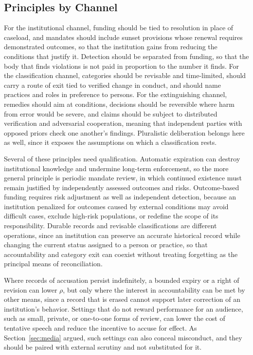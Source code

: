 \documentclass[12pt]{article}
\theoremstyle{remark}
\begin{document}
\subsection{Principles by Channel}

For the institutional channel, funding should be tied to resolution in place of caseload, and mandates should include sunset provisions whose renewal requires demonstrated outcomes, so that the institution gains from reducing the conditions that justify it. Detection should be separated from funding, so that the body that finds violations is not paid in proportion to the number it finds. For the classification channel, categories should be revisable and time-limited, should carry a route of exit tied to verified change in conduct, and should name practices and roles in preference to persons. For the extinguishing channel, remedies should aim at conditions, decisions should be reversible where harm from error would be severe, and claims should be subject to distributed verification and adversarial cooperation, meaning that independent parties with opposed priors check one another's findings. Pluralistic deliberation belongs here as well, since it exposes the assumptions on which a classification rests.

Several of these principles need qualification. Automatic expiration can destroy institutional knowledge and undermine long-term enforcement, so the more general principle is periodic mandate review, in which continued existence must remain justified by independently assessed outcomes and risks. Outcome-based funding requires risk adjustment as well as independent detection, because an institution penalized for outcomes caused by external conditions may avoid difficult cases, exclude high-risk populations, or redefine the scope of its responsibility. Durable records and revisable classifications are different operations, since an institution can preserve an accurate historical record while changing the current status assigned to a person or practice, so that accountability and category exit can coexist without treating forgetting as the principal means of reconciliation.

Where records of accusation persist indefinitely, a bounded expiry or a right of revision can lower $\rho$, but only where the interest in accountability can be met by other means, since a record that is erased cannot support later correction of an institution's behavior. Settings that do not reward performance for an audience, such as small, private, or one-to-one forms of review, can lower the cost of tentative speech and reduce the incentive to accuse for effect. As Section~\ref{sec:media} argued, such settings can also conceal misconduct, and they should be paired with external scrutiny and not substituted for it.
\end{document}
